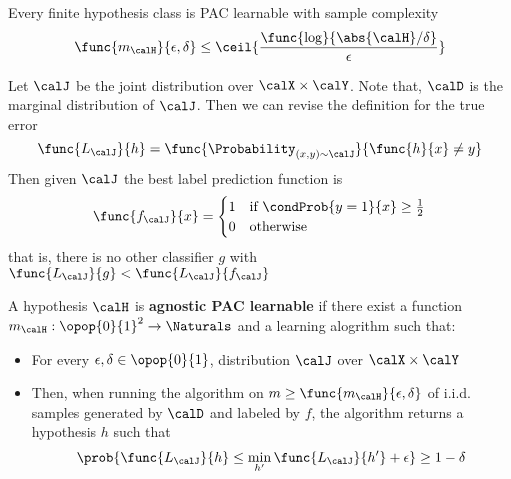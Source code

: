 \begin{corollary}
    Every finite hypothesis class is PAC learnable with sample complexity 
    \begin{equation*}
        \func{m_{\calH}}{\epsilon, \delta} \leq \ceil{\frac{\func{\log}{\abs{\calH}/\delta }}{\epsilon}}
    \end{equation*}
\end{corollary}

Let \(\calJ\) be the joint distribution over \(\calX \times \calY\). Note that, \(\calD\) is the marginal distribution of \(\calJ\). Then we can revise the definition for the true error 
\begin{equation*}
    \func{L_{\calJ}}{h} = \func{\Probability_{(x,y) \sim \calJ}}{\func{h}{x} \neq y}
\end{equation*}
Then given \(\calJ\) the best label prediction function is 
\begin{equation*}
    \func{f_{\calJ}}{x} = \begin{cases}
        1 & \text{if} \ \condProb{y = 1}{x} \geq \frac{1}{2}\\
        0 & \text{otherwise}
    \end{cases}
\end{equation*}
that is, there is no other classifier \(g\) with \(\func{L_{\calJ}}{g} < \func{L_{\calJ}}{f_{\calJ}}\)

\begin{definition}
    A hypothesis \(\calH\) is \textbf{agnostic PAC learnable} if there exist a function \(m_{\calH} : \opop{0}{1}^2 \to \Naturals\) and a learning alogrithm such that:
    \begin{itemize}
        \item For every \(\epsilon,\delta \in \opop{0}{1}\), distribution \(\calJ\) over \(\calX \times \calY\)
        \item Then, when running the algorithm on \(m \geq \func{m_{\calH}}{\epsilon,\delta}\) of i.i.d. samples generated by \(\calD\) and labeled by \(f\), the algorithm returns a hypothesis \(h\) such that 
        \begin{equation*}
            \prob{\func{L_{\calJ}}{h} \leq \min_{h'} \func{L_{\calJ}}{h'} + \epsilon} \geq 1- \delta
        \end{equation*}
    \end{itemize}
\end{definition}

